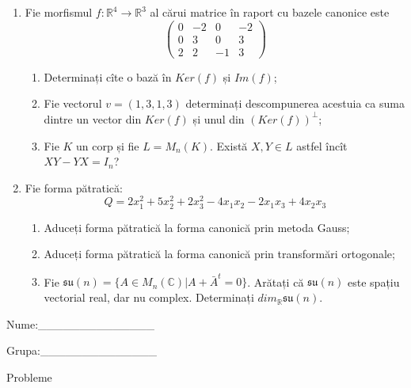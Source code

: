 \documentclass{article}
\begin{document}
\begin{enumerate}
 \item Fie morfismul $f:\mathbb{R}^4 \to \mathbb{R}^3$ al cărui matrice în raport cu bazele canonice este
$$\begin{pmatrix}
0&-2&0&-2\\
0&3&0&3\\
2&2&-1&3
\end{pmatrix}$$

\begin{enumerate}
\item Determinați cîte o bază în $Ker(f)$ și $Im(f)$;
\item Fie vectorul $v=(1,3,1,3)$ determinați descompunerea acestuia ca suma dintre un vector din $Ker(f)$ și unul din $(Ker(f))^\perp$;
\item Fie $K$ un corp și fie $L=M_n(K)$. Există $X,Y \in L$ astfel încît $XY-YX=I_n$?  
\end{enumerate}
\item Fie forma pătratică:
$$Q= 2x_1^2+5x_2^2+2x_3^2-4x_1x_2-2x_1x_3+4x_2x_3$$

\begin{enumerate}
\item Aduceți forma pătratică la forma canonică prin metoda Gauss;
\item Aduceți forma pătratică la forma canonică prin transformări ortogonale;
\item Fie $\mathfrak{su}(n)=\{ A \in M_n(\mathbb{C}) | A+\bar{A}^t=0\}$. Arătați că $\mathfrak{su}(n)$ este spațiu vectorial real, dar nu complex.
Determinați $dim_{\mathbb{R}}\mathfrak{su}(n)$.
\end{enumerate}
\end{enumerate}
\newpage
\begin{flushright}
Nume:\_\_\_\_\_\_\_\_\_\_\_\_\_\_
 
 
Grupa:\_\_\_\_\_\_\_\_\_\_\_\_\_\_
\end{flushright}
\begin{center}
\vspace{2cm}
{\Large Probleme}
\vspace{2cm}
\end{center}
\end{document}
